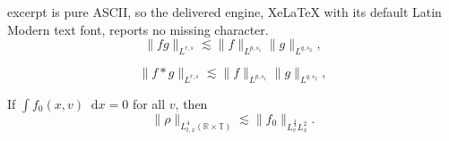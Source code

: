 \documentclass[10pt,a4paper]{amsart}
\newcommand{\dd}{\mathop{}\!\mathrm{d}}
\begin{document}
excerpt is pure ASCII, so the delivered engine, XeLaTeX with its default Latin Modern text font, reports no missing character.
\begin{equation}
    \label{holder-oneil}
        \|fg\|_{L^{r,s}} \lesssim \|f\|_{L^{p,s_1}}\|g\|_{L^{q,s_2}},
\end{equation}

\begin{equation}
    \label{eq.young-oneil}
    \|f*g\|_{L^{r,s}} \lesssim \|f\|_{L^{p,s_1}}\|g\|_{L^{q,s_2}}, 
\end{equation}

\begin{lemma}[$L^4$ estimate]
\label{lemmaL4}
If $\int f_0(x,v) \dd x = 0$ for all $v$, then
\[
    \| \rho \|_{L^4_{t,x}(\mathbb{R} \times \mathbb{T})} \lesssim \| f_0 \|_{L^{\frac 43}_v L^2_x}.
\]
\end{lemma} 
\end{document}
